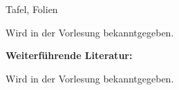 \begin{course}
\begin{content}
\end{content}

\begin{media}Tafel, Folien

\end{media}

\begin{literature}Wird in der Vorlesung bekanntgegeben.

\textbf{Weiterführende Literatur:}

Wird in der Vorlesung bekanntgegeben.

\end{literature}



\end{course}